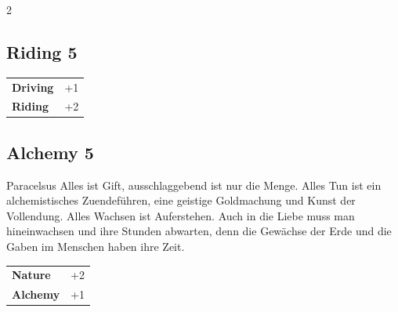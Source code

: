 \begin{multicols}{2}
\begin{tcolorbox}
\end{tcolorbox}

\begin{tcolorbox}
    \subsection*{Riding \hfill \small{5 }}
    \tcblower




\begin{tabular}{@{}ll@{}}
    \textbf{Driving} & +1\\
    \textbf{Riding} & +2\\
\end{tabular}


\end{tcolorbox}

\begin{tcolorbox}
    \subsection*{Alchemy \hfill \small{5 }}
    \tcblower


\begin{pquote}{Paracelsus}
Alles ist Gift, ausschlaggebend ist nur die Menge. Alles Tun ist ein alchemistisches Zuendeführen, eine geistige Goldmachung und Kunst der Vollendung. Alles Wachsen ist Auferstehen. Auch in die Liebe muss man hineinwachsen und ihre Stunden abwarten, denn die Gewächse der Erde und die Gaben im Menschen haben ihre Zeit.
\end{pquote}

\vspace{3mm}

\begin{tabular}{@{}ll@{}}
    \textbf{Nature} & +2\\
    \textbf{Alchemy} & +1\\
\end{tabular}


\end{tcolorbox}

\begin{tcolorbox}

\end{tcolorbox}
\end{multicols}
